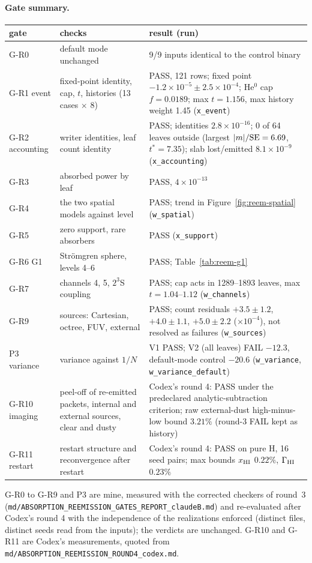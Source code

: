 \documentclass[english,a4paper]{my_memo}
\newcommand{\code}[1]{\texttt{#1}}
\begin{document}
\paragraph{Gate summary.}
\begin{center}\small
\begin{longtable}{@{}p{2.1cm}p{5.3cm}p{6.6cm}@{}}
\toprule
gate & checks & result (run) \\
\midrule
\endhead
G-R0 & default mode unchanged & 9/9 inputs identical to the control binary \\
G-R1 event & fixed-point identity, cap, $t$, histories (13 cases $\times$ 8) &
PASS, 121 rows; fixed point $-1.2\times10^{-5}\pm2.5\times10^{-4}$; He$^0$ cap
$f=0.0189$; max $t=1.156$, max history weight 1.45 (\code{x\_event}) \\
G-R2 accounting & writer identities, leaf count identity & PASS; identities
$2.8\times10^{-16}$; 0 of 64 leaves outside (largest $|m|/{\rm SE}=6.69$,
$t^*=7.35$); slab lost/emitted $8.1\times10^{-9}$ (\code{x\_accounting}) \\
G-R3 & absorbed power by leaf & PASS, $4\times10^{-13}$ \\
G-R4 & the two spatial models against level & PASS; trend in
Figure~\ref{fig:reem-spatial} (\code{w\_spatial}) \\
G-R5 & zero support, rare absorbers & PASS (\code{x\_support}) \\
G-R6 G1 & Str\"omgren sphere, levels 4--6 & PASS; Table~\ref{tab:reem-g1} \\
G-R7 & channels 4, 5, $2^3$S coupling & PASS; cap acts in 1289--1893 leaves,
max $t=1.04$--$1.12$ (\code{w\_channels}) \\
G-R9 & sources: Cartesian, octree, FUV, external & PASS; count residuals
$+3.5\pm1.2$, $+4.0\pm1.1$, $+5.0\pm2.2$ ($\times10^{-4}$), not resolved as
failures (\code{w\_sources}) \\
P3 variance & variance against $1/N$ & V1 PASS; V2 (all leaves) FAIL $-12.3$,
default-mode control $-20.6$ (\code{w\_variance}, \code{w\_variance\_default}) \\
G-R10 imaging & peel-off of re-emitted packets, internal and external
sources, clear and dusty & Codex's round 4: PASS under the predeclared
analytic-subtraction criterion; raw external-dust high-minus-low bound
$3.21\%$ (round-3 FAIL kept as history) \\
G-R11 restart & restart structure and reconvergence after restart & Codex's
round 4: PASS on pure H, 16 seed pairs; max bounds $x_{\rm HI}$ $0.22\%$,
$\Gamma_{\rm HI}$ $0.23\%$ \\
\bottomrule
\end{longtable}
\end{center}
G-R0 to G-R9 and P3 are mine, measured with the corrected checkers of
round~3 (\code{md/\allowbreak ABSORPTION\_REEMISSION\_\allowbreak GATES\_REPORT\_\allowbreak claudeB.md})
and re-evaluated after Codex's round 4 with the independence of the
realizations enforced (distinct files, distinct seeds read from the inputs);
the verdicts are unchanged.  G-R10 and G-R11 are Codex's measurements,
quoted from \code{md/\allowbreak ABSORPTION\_REEMISSION\_\allowbreak ROUND4\_codex.md}.
\end{document}
